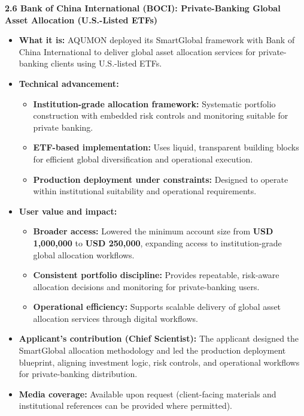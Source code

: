 \documentclass[11pt]{article}
\newcommand{\CVSubsection}[1]{\textbf{#1}\par}
\newenvironment{tightitemize}{%
  \begin{itemize}[leftmargin=*,nosep,topsep=2pt]
}{\end{itemize}}
\begin{document}
\CVSubsection{2.6 Bank of China International (BOCI): Private-Banking Global Asset Allocation (U.S.-Listed ETFs)}

\begin{tightitemize}
  \item \textbf{What it is:} AQUMON deployed its SmartGlobal framework with Bank of China International to deliver global asset allocation services for private-banking clients using U.S.-listed ETFs.
  \item \textbf{Technical advancement:}
  \begin{tightitemize}
    \item \textbf{Institution-grade allocation framework:} Systematic portfolio construction with embedded risk controls and monitoring suitable for private banking.
    \item \textbf{ETF-based implementation:} Uses liquid, transparent building blocks for efficient global diversification and operational execution.
    \item \textbf{Production deployment under constraints:} Designed to operate within institutional suitability and operational requirements.
  \end{tightitemize}
  \item \textbf{User value and impact:}
  \begin{tightitemize}
    \item \textbf{Broader access:} Lowered the minimum account size from \textbf{USD 1,000,000} to \textbf{USD 250,000}, expanding access to institution-grade global allocation workflows.
    \item \textbf{Consistent portfolio discipline:} Provides repeatable, risk-aware allocation decisions and monitoring for private-banking users.
    \item \textbf{Operational efficiency:} Supports scalable delivery of global asset allocation services through digital workflows.
  \end{tightitemize}
  \item \textbf{Applicant’s contribution (Chief Scientist):} The applicant designed the SmartGlobal allocation methodology and led the production deployment blueprint, aligning investment logic, risk controls, and operational workflows for private-banking distribution.
  \item \textbf{Media coverage:} Available upon request (client-facing materials and institutional references can be provided where permitted).
\end{tightitemize}
\end{document}
